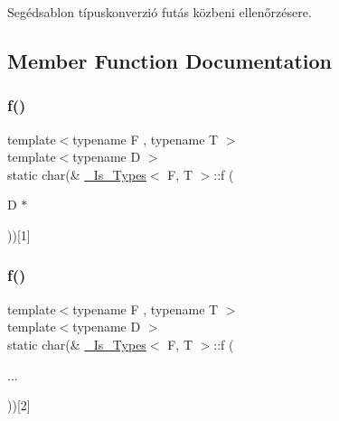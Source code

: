 Segédsablon típuskonverzió futás közbeni ellenőrzésere. 

\subsection{Member Function Documentation}
\mbox{\label{struct___is___types_a1bd22cb90b9438997283201839aec09f}} 
\subsubsection{\texorpdfstring{f()}{f()}\hspace{0.1cm}{\footnotesize\ttfamily [1/2]}}
{\footnotesize\ttfamily template$<$typename F , typename T $>$ \\
template$<$typename D $>$ \\
static char(\& \mbox{\hyperlink{struct___is___types}{\+\_\+\+Is\+\_\+\+Types}}$<$ F, T $>$\+::f (\begin{DoxyParamCaption}\item[{D $\ast$}]{ }\end{DoxyParamCaption}))\mbox{[}1\mbox{]}\hspace{0.3cm}{\ttfamily [static]}}

\mbox{\label{struct___is___types_a013da65c5a92e9bd02f5d361c10d376d}} 
\subsubsection{\texorpdfstring{f()}{f()}\hspace{0.1cm}{\footnotesize\ttfamily [2/2]}}
{\footnotesize\ttfamily template$<$typename F , typename T $>$ \\
template$<$typename D $>$ \\
static char(\& \mbox{\hyperlink{struct___is___types}{\+\_\+\+Is\+\_\+\+Types}}$<$ F, T $>$\+::f (\begin{DoxyParamCaption}\item[{}]{... }\end{DoxyParamCaption}))\mbox{[}2\mbox{]}\hspace{0.3cm}{\ttfamily [static]}}



